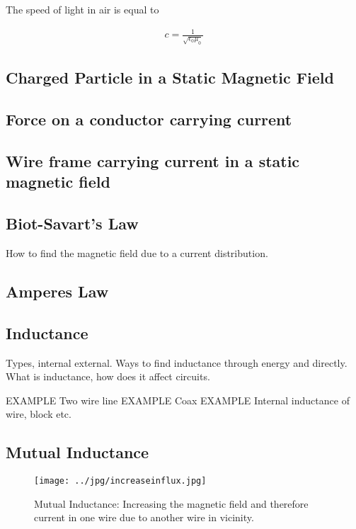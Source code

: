 The speed of light in air is equal to 

\begin{eqnarray}
c=\frac{1}{\sqrt{\epsilon_0 \mu_0}}
\end{eqnarray}  

 
\subsection{Charged Particle in a Static Magnetic Field}



\subsection{Force on a conductor carrying current}


\subsection{Wire frame carrying current in a static magnetic field}


\subsection{Biot-Savart's Law}
How to find the magnetic field due to a current distribution.





\subsection{Amperes Law}


\subsection{Inductance}
Types, internal external.  Ways to find inductance through energy and directly. What is inductance, how does it affect circuits.

{\large EXAMPLE} Two wire line
{\large EXAMPLE} Coax
{\large EXAMPLE} Internal inductance of wire, block etc.

\subsection{Mutual Inductance}


\begin{figure}[htbp]
\begin{center}
\texttt{[image: ../jpg/increaseinflux.jpg]}
\end{center}
\caption{Mutual Inductance: Increasing the magnetic field and therefore current in one wire due to another wire in vicinity. }
\label{MutualInduc}
\end{figure}



